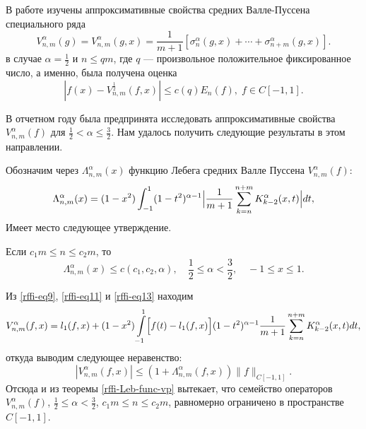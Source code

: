 В работе \cite{rffi-15} изучены аппроксимативные свойства средних Валле-Пуссена специального ряда 
\begin{equation}\label{rffi-eq13}
V_{n,m}^\alpha(g)=V_{n,m}^\alpha(g,x)=\frac{1}{m+1}[\sigma_n^\alpha(g,x)+\cdots+\sigma_{n+m}^\alpha(g,x)].
\end{equation}
в случае $\alpha=\frac{1}{2}$ и $n \le qm$, где $q$ --- произвольное положительное фиксированное число, а именно, была получена оценка
\begin{equation}\label{rffi-est-Vp05}
|f(x)-V_{n,m}^\frac{1}{2}(f,x)| \le c(q) E_n(f), \; f \in C[-1,1].
\end{equation}

В отчетном году была предпринята  исследовать аппроксимативные свойства $V_{n,m}^\alpha(f)$ для $\frac{1}{2} < \alpha \le \frac{3}{2}$. Нам удалось получить следующие результаты в этом направлении.

Обозначим через $\Lambda_{n,m}^\alpha(x)$ функцию Лебега средних Валле Пуссена $V_{n,m}^\alpha(f)$:
\begin{equation*}
\Lambda_{n,m}^\alpha(x)=
(1-x^2)\int_{-1}^{1}(1-t^2)^{\alpha-1}\Bigl|
\frac{1}{m+1}\sum\limits_{k=n}^{n+m}K^\alpha_{k-2}(x,t)
\Bigr|dt,
\end{equation*}
Имеет место следующее утверждение.
\begin{theorem}\label{rffi-Leb-func-vp}
Если $c_1 m \le n \le c_2 m$, то
\begin{equation}
  \Lambda_{n,m}^\alpha(x)\le c(c_1, c_2, \alpha), \quad \frac12 \le \alpha < \frac32, \quad -1 \le x \le 1.
\end{equation}
\end{theorem}

Из \eqref{rffi-eq9}, \eqref{rffi-eq11} и \eqref{rffi-eq13} находим
\begin{equation*}
V_{n,m}^\alpha(f,x)=
l_1(f,x)+(1-x^2)\int\limits_{-1}^{1}
\Bigl[
f(t)-l_1(f,x)
\Bigr]
(1-t^2)^{\alpha-1}\frac{1}{m+1}\sum\limits_{k=n}^{n+m}K_{k-2}^\alpha(x,t)dt,
\end{equation*}
откуда выводим следующее неравенство:
\begin{equation*}
|V_{n,m}^\alpha(f,x)| \le (1+\Lambda_{n,m}^\alpha(f,x))\|f\|_{C[-1,1]}.
\end{equation*}
Отсюда и из теоремы \ref{rffi-Leb-func-vp} вытекает, что семейство операторов $V_{n,m}^\alpha(f)$, $\frac12\le \alpha < \frac32$, $c_1m \le n\le c_2m$, равномерно ограничено в пространстве $C[-1,1]$.

